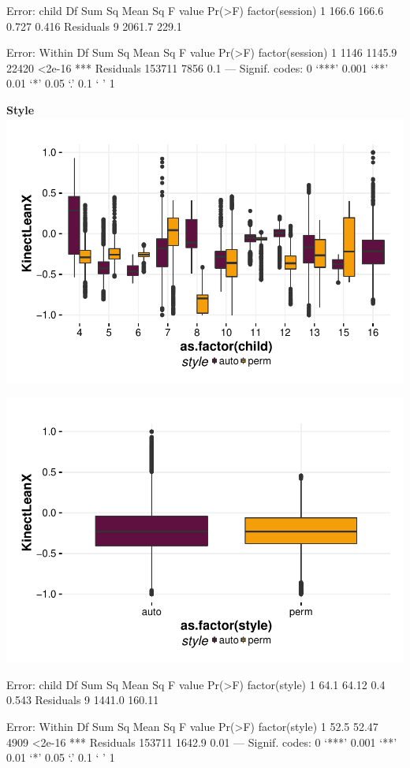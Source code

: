 \documentclass{article}
\begin{document}
\begin{Schunk}
\begin{Soutput}
Error: child
                Df Sum Sq Mean Sq F value Pr(>F)
factor(session)  1  166.6   166.6   0.727  0.416
Residuals        9 2061.7   229.1               

Error: Within
                    Df Sum Sq Mean Sq F value Pr(>F)    
factor(session)      1   1146  1145.9   22420 <2e-16 ***
Residuals       153711   7856     0.1                   
---
Signif. codes:  0 ‘***’ 0.001 ‘**’ 0.01 ‘*’ 0.05 ‘.’ 0.1 ‘ ’ 1
\end{Soutput}
\end{Schunk}

\textbf{Style}
\includegraphics{features-plot_leanx_child_style_quiz}

\includegraphics{features-plot_leanx_style_quiz}

\begin{Schunk}
\begin{Soutput}
Error: child
              Df Sum Sq Mean Sq F value Pr(>F)
factor(style)  1   64.1   64.12     0.4  0.543
Residuals      9 1441.0  160.11               

Error: Within
                  Df Sum Sq Mean Sq F value Pr(>F)    
factor(style)      1   52.5   52.47    4909 <2e-16 ***
Residuals     153711 1642.9    0.01                   
---
Signif. codes:  0 ‘***’ 0.001 ‘**’ 0.01 ‘*’ 0.05 ‘.’ 0.1 ‘ ’ 1
\end{Soutput}
\end{Schunk}
\end{document}
